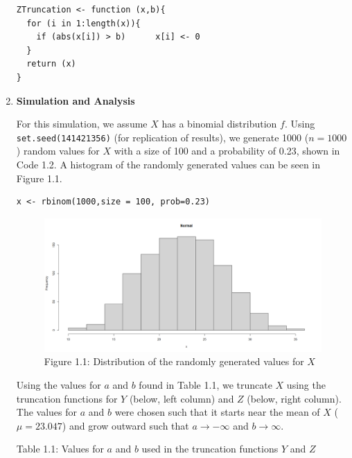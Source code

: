 \documentclass[12pt,letterpaper]{article}
\newcommand{\code}[1]{\colorbox{light-gray}{\texttt{#1}}}
\begin{document}
\begin{enumerate}[label=\Alph*]
\begin{lstlisting}[title=\footnotesize Code 1.1: Function for the truncation of $Y$ and $Z$]
ZTruncation <- function (x,b){
  for (i in 1:length(x)){
    if (abs(x[i]) > b)      x[i] <- 0
  }
  return (x)
}
        \end{lstlisting}
        \vspace*{0.5cm}
       \item \textbf{Simulation and Analysis} 
       
       For this simulation, we assume $X$ has a binomial distribution $f$. Using \code{set.seed(141421356)} (for replication of results), we generate 1000 ($n=1000$) random values for $X$ with a size of 100 and a probability of 0.23, shown in Code 1.2. A histogram of the randomly generated values can be seen in Figure 1.1.
       \begin{lstlisting}[title=\footnotesize Code 1.2: Initialization of $X$]
x <- rbinom(1000,size = 100, prob=0.23)  
       \end{lstlisting}

       \begin{figure}[h]
          \centering 
          \includegraphics[scale=0.4]{normal.png}
          \caption*{\footnotesize Figure 1.1: Distribution of the randomly generated values for $X$}
       \end{figure}
       
       \newpage
       Using the values for $a$ and $b$ found in Table 1.1, we truncate $X$ using the truncation functions for $Y$ (below, left column) and $Z$ (below, right column). The values for $a$ and $b$ were chosen such that it starts near the mean of $X$ ($\mu = 23.047$) and grow outward such that $a\rightarrow -\infty$ and $b \rightarrow \infty$.

       \begin{table}[H]\centering
          \footnotesize Table 1.1: Values for $a$ and $b$ used in the truncation functions $Y$ and $Z$


\end{table}
\end{enumerate}
\end{document}
